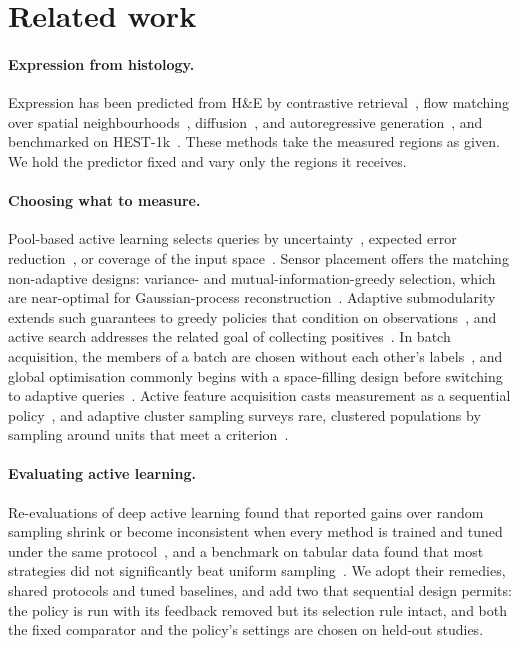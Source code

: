 \documentclass[10pt]{article}
\begin{document}
\section{Related work}
\label{sec:related}

\paragraph{Expression from histology.} Expression has been predicted from H\&E by contrastive
retrieval~\citep{xie2023bleep}, flow matching over spatial neighbourhoods~\citep{huang2025stflow},
diffusion~\citep{zhu2025stem}, and autoregressive generation~\citep{genar2025}, and benchmarked on
HEST-1k~\citep{jaume2024hest}. These methods take the measured regions as given. We hold the predictor fixed and
vary only the regions it receives.

\paragraph{Choosing what to measure.} Pool-based active learning selects queries by uncertainty~\citep{lewis1994sequential},
expected error reduction~\citep{roy2001toward}, or coverage of the input space~\citep{sener2018active}. Sensor
placement offers the matching non-adaptive designs: variance- and mutual-information-greedy selection, which are
near-optimal for Gaussian-process reconstruction~\citep{krause2008near}. Adaptive submodularity extends such
guarantees to greedy policies that condition on observations~\citep{golovin2011adaptive}, and active search
addresses the related goal of collecting positives~\citep{garnett2012bayesian}. In batch acquisition, the members
of a batch are chosen without each other's labels~\citep{kirsch2019batchbald}, and global optimisation commonly
begins with a space-filling design before switching to adaptive queries~\citep{jones1998efficient}. Active feature acquisition casts measurement as a
sequential policy~\citep{yin2020afa}, and adaptive cluster sampling surveys rare, clustered populations by sampling
around units that meet a criterion~\citep{thompson1990adaptive}.

\paragraph{Evaluating active learning.} Re-evaluations of deep active learning found that reported gains over
random sampling shrink or become inconsistent when every method is trained and tuned under the same
protocol~\citep{mittal2019parting,munjal2022towards,luth2023navigating}, and a benchmark on tabular data found that
most strategies did not significantly beat uniform sampling~\citep{lu2025expanded}. We adopt their remedies, shared
protocols and tuned baselines, and add two that sequential design permits: the policy is run with its feedback
removed but its selection rule intact, and both the fixed comparator and the policy's settings are chosen on held-out
studies.
\end{document}
